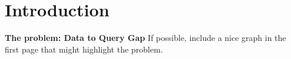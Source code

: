 \section{Introduction}
\label{sec:introduction}

\textbf{The problem: Data to Query Gap}
If possible, include a nice graph in the first page that might highlight the problem.

\begin{figure}[t]
     \begin{center}
	\subfigure[]{%
            \label{fig:randomDsameS001}
}
\end{center}
\end{figure}

